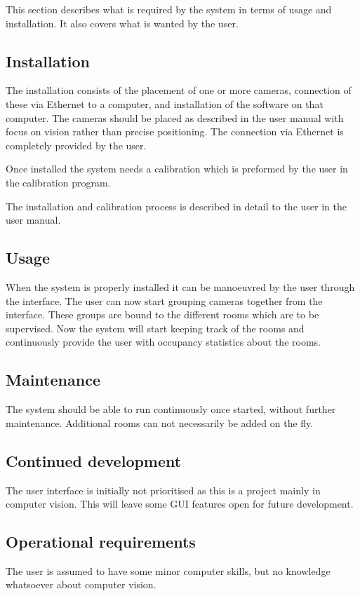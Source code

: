 This section describes what is required by the system in terms of usage and installation. It also covers what is wanted by the user. 

\subsection{Installation}
The installation consists of the placement of one or more cameras, connection of these via Ethernet to a computer, and installation of the software on that computer. The cameras should be placed as described in the user manual with focus on vision rather than precise positioning. The connection via Ethernet is completely provided by the user.     

Once installed the system needs a calibration which is preformed by the user in the calibration program.

The installation and calibration process is described in detail to the user in the user manual.

\subsection{Usage}
When the system is properly installed it can be manoeuvred by the user through the interface. The user can now start grouping cameras together from the interface. These groups are bound to the different rooms which are to be supervised. Now the system will start keeping track of the rooms and continuously provide the user with occupancy statistics about the rooms. 

\subsection{Maintenance}
The system should be able to run continuously once started, without further maintenance. Additional rooms can not necessarily be added on the fly. 

\subsection{Continued development}
The user interface is initially not prioritised as this is a project mainly in computer vision. This will leave some GUI features open for future development. 

\subsection{Operational requirements}
The user is assumed to have some minor computer skills, but no knowledge whatsoever about computer vision. 


\label{sec:ui_req}
\reqtable
{
}